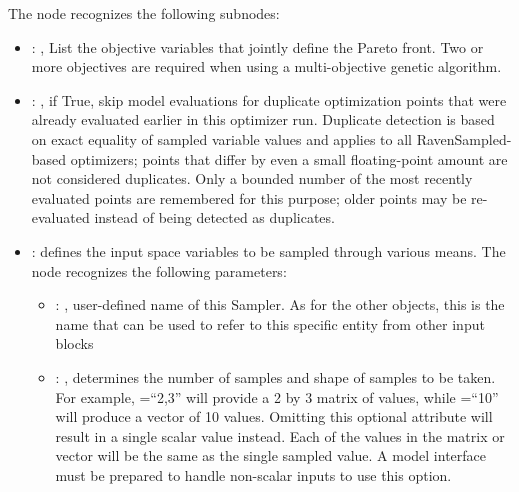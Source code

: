   The  node recognizes the following subnodes:
  \begin{itemize}
    \item {}: ,
      List the objective variables that jointly define the Pareto front. Two or more
      objectives are required when using a multi-objective genetic algorithm.

    \item {}: ,
      if True, skip model evaluations for duplicate optimization points that were already
      evaluated earlier in this optimizer run. Duplicate detection is based on exact equality of
      sampled variable values and applies to all RavenSampled-based optimizers; points that differ
      by even a small floating-point amount are not considered duplicates. Only a bounded number
      of the most recently evaluated points are remembered for this purpose; older points may be
      re-evaluated instead of being detected as duplicates. 

    \item {}:
      defines the input space variables to be sampled through various means.
      The  node recognizes the following parameters:
        \begin{itemize}
          \item {}: ,
            user-defined name of this Sampler. \nb As for the other objects,               this is
            the name that can be used to refer to this specific entity from other input blocks
          \item {}: ,
            determines the number of samples and shape of samples               to be taken.  For
            example, =``2,3'' will provide a 2 by 3               matrix of values,
            while =``10'' will produce a vector of 10 values.               Omitting
            this optional attribute will result in a single scalar value instead.               Each
            of the values in the matrix or vector will be the same as the single sampled value.
            \nb A model interface must be prepared to handle non-scalar inputs to use this option.
      \end{itemize}


\end{itemize}
